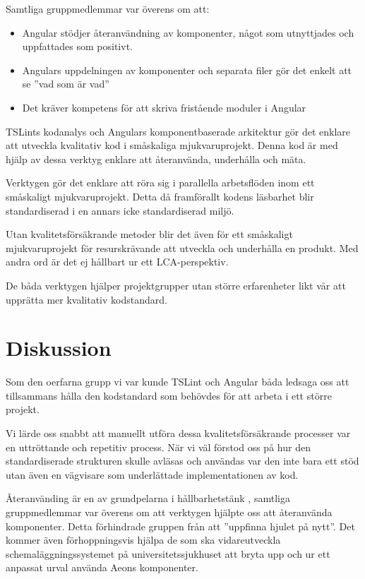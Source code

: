 Samtliga gruppmedlemmar var överens om att:

\begin{itemize}
	\item Angular stödjer återanvändning av komponenter, något som utnyttjades och uppfattades som positivt.
	\item Angulars uppdelningen av komponenter och separata filer gör det enkelt att se ''vad som är vad''
	\item Det kräver kompetens för att skriva fristående moduler i Angular
\end{itemize}

TSLints kodanalys och Angulars komponentbaserade arkitektur gör det enklare att utveckla kvalitativ kod i småskaliga mjukvaruprojekt. Denna kod är med hjälp av dessa verktyg enklare att återanvända, underhålla och mäta.

Verktygen gör det enklare att röra sig i parallella arbetsflöden inom ett småskaligt mjukvaruprojekt. Detta då framförallt kodens läsbarhet blir standardiserad i en annars icke standardiserad miljö.

Utan kvalitetsförsäkrande metoder blir det även för ett småskaligt mjukvaruprojekt för resurskrävande att utveckla och underhålla en produkt. Med andra ord är det ej hållbart ur ett LCA-perspektiv.

De båda verktygen hjälper projektgrupper utan större erfarenheter likt vår att upprätta mer kvalitativ kodstandard.

\section{Diskussion}

Som den oerfarna  grupp vi var kunde TSLint och Angular båda ledsaga oss att tillsammans hålla den kodstandard som behövdes för att arbeta i ett större projekt.

Vi lärde oss snabbt att manuellt utföra dessa kvalitetsförsäkrande processer var en uttröttande och repetitiv process. När vi väl förstod oss på hur den standardiserade strukturen skulle avläsas och användas var den inte bara ett stöd utan även en vägvisare som underlättade implementationen av kod.

Återanvänding är en av grundpelarna i hållbarhetstänk \cite{sustainable}, samtliga gruppmedlemmar var överens om att verktygen hjälpte oss att återanvända komponenter. Detta förhindrade gruppen från att ''uppfinna hjulet på nytt''. Det kommer även förhoppningsvis hjälpa de som ska vidareutveckla schemaläggningssystemet på universitetssjukhuset att bryta upp och ur ett anpassat urval använda Aeons komponenter.

